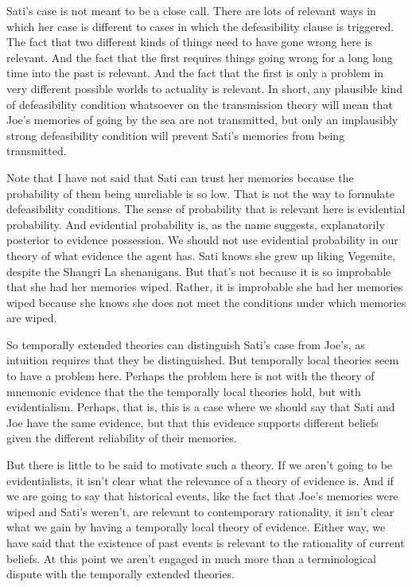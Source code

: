 \documentclass[
  11pt,
  letterpaper,
  DIV=11,
  numbers=noendperiod,
  twoside]{scrartcl}
\begin{document}
Sati's case is not meant to be a close call. There are lots of relevant
ways in which her case is different to cases in which the defeasibility
clause is triggered. The fact that two different kinds of things need to
have gone wrong here is relevant. And the fact that the first requires
things going wrong for a long long time into the past is relevant. And
the fact that the first is only a problem in very different possible
worlds to actuality is relevant. In short, any plausible kind of
defeasibility condition whatsoever on the transmission theory will mean
that Joe's memories of going by the sea are not transmitted, but only an
implausibly strong defeasibility condition will prevent Sati's memories
from being transmitted.

Note that I have not said that Sati can trust her memories because the
probability of them being unreliable is so low. That is not the way to
formulate defeasibility conditions. The sense of probability that is
relevant here is evidential probability. And evidential probability is,
as the name suggests, explanatorily posterior to evidence possession. We
should not use evidential probability in our theory of what evidence the
agent has. Sati knows she grew up liking Vegemite, despite the Shangri
La shenanigans. But that's not because it is so improbable that she had
her memories wiped. Rather, it is improbable she had her memories wiped
because she knows she does not meet the conditions under which memories
are wiped.

So temporally extended theories can distinguish Sati's case from Joe's,
as intuition requires that they be distinguished. But temporally local
theories seem to have a problem here. Perhaps the problem here is not
with the theory of mnemonic evidence that the the temporally local
theories hold, but with evidentialism. Perhaps, that is, this is a case
where we should say that Sati and Joe have the same evidence, but that
this evidence supports different beliefs given the different reliability
of their memories.

But there is little to be said to motivate such a theory. If we aren't
going to be evidentialists, it isn't clear what the relevance of a
theory of evidence is. And if we are going to say that historical
events, like the fact that Joe's memories were wiped and Sati's weren't,
are relevant to contemporary rationality, it isn't clear what we gain by
having a temporally local theory of evidence. Either way, we have said
that the existence of past events is relevant to the rationality of
current beliefs. At this point we aren't engaged in much more than a
terminological dispute with the temporally extended theories.
\end{document}
